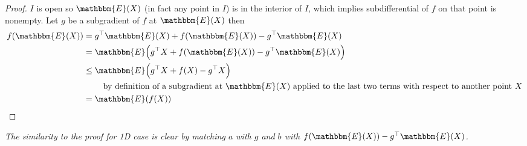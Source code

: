 \documentclass[10pt,a4paper]{article}
\theoremstyle{definition}
\def\E{\mathbbm{E}}
\begin{document}
\begin{proof}
$I$ is open so $\E(X)$ (in fact any point in $I$) is in the interior of $I$, which implies subdifferential of $f$ on that point is nonempty. Let $g$ be a subgradient of $f$ at $\E(X)$ then
\begin{align*}
f(\E(X)) &= g^{\top} \E(X) + f(\E(X)) -  g^{\top} \E(X) \\
&= \E\Big( g^{\top} X + f(\E(X)) -  g^{\top} \E(X) \Big) \\
&\leq \E\Big( g^{\top} X + f(X) -  g^{\top} X \Big) \\
& \qquad \text{ by definition of a subgradient at } \E(X) \text{ applied to the last two terms with respect to another point } X \\
&= \E(f(X))
\end{align*}
\end{proof}

\begin{remark} \textit{The similarity to the proof for 1D case is clear by matching $a$ with $g$ and $b$ with $f(\E(X)) -  g^{\top} \E(X)$.}
\end{remark}
\end{document}
